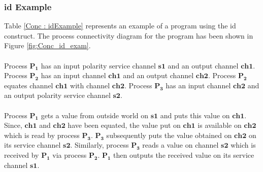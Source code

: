 \documentclass[11pt]{article}
\newcommand{\<}{\langle}
\renewcommand{\>}{\rangle}
\begin{document}
\subsubsection {id Example}

Table \ref {Conc : idExample} represents an example of a program using the {\sf id} construct. The process connectivity diagram for the program has been shown in Figure \ref {fig:Conc_id_exam}.
~~\\~~\\
Process $\mathbf{P_1}$ has an input polarity service channel $\mathbf{s1}$ and an output channel $\mathbf{ch1}$. Process $\mathbf{P_2}$ has an input channel $\mathbf{ch1}$ and an output channel $\mathbf{ch2}$. Process $\mathbf{P_2}$ equates channel $\mathbf{ch1}$ with channel $\mathbf{ch2}$. Process $\mathbf{P_3}$ has an input channel $\mathbf{ch2}$ and an output polarity service channel $\mathbf{s2}$.
~~\\~~\\ 
Process $\mathbf{P_1}$ gets a value from outside world on $\mathbf{s1}$ and puts this value on $\mathbf{ch1}$. Since, $\mathbf{ch1}$ and $\mathbf{ch2}$ have been equated, the value put on $\mathbf{ch1}$ is available on $\mathbf{ch2}$ which is read by process $\mathbf{P_3}$. $\mathbf{P_3}$ subsequently puts the value obtained on $\mathbf{ch2}$ on its service channel $\mathbf{s2}$.
Similarly, process $\mathbf{P_3}$ reads a value on channel $\mathbf{s2}$ which is received by $\mathbf{P_1}$ via process $\mathbf{P_2}$. $\mathbf{P_1}$ then outputs the received value on its service channel $\mathbf{s1}$.
\end{document}
